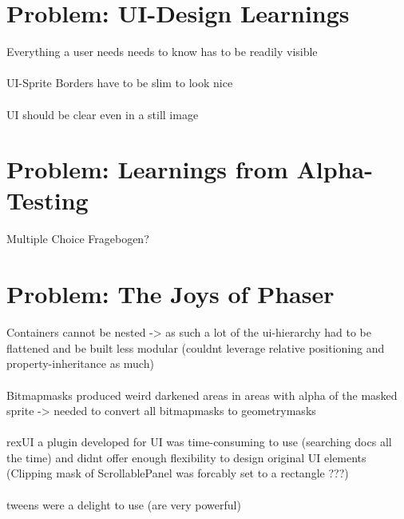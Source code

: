 \documentclass[a4paper,american]{paper}
\begin{document}
\section*{Problem: UI-Design Learnings}
Everything a user needs needs to know has to be readily visible  \\\\
UI-Sprite Borders have to be slim to look nice \\\\
UI should be clear even in a still image

\section*{Problem: Learnings from Alpha-Testing}
Multiple Choice Fragebogen?

\section*{Problem: The Joys of Phaser}
Containers cannot be nested -> as such a lot of the ui-hierarchy had to be flattened and be built less modular (couldnt leverage relative positioning and property-inheritance as much) \\\\
Bitmapmasks produced weird darkened areas in areas with alpha of the masked sprite -> needed to convert all bitmapmasks to geometrymasks \\\\
rexUI a plugin developed for UI was time-consuming to use (searching docs all the time) and didnt offer enough flexibility to design original UI elements (Clipping mask of ScrollablePanel was forcably set to a rectangle ???) \\\\
tweens were a delight to use (are very powerful)
\end{document}
